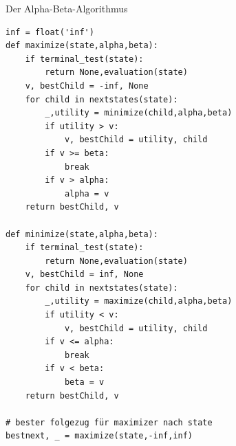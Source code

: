 %    
% 
% 
%    

\begin{frame}[fragile]
Der Alpha-Beta-Algorithmus \\
\begin{minipage}[t]{7.5cm}
\begin{lstlisting}[basicstyle=\tiny]
inf = float('inf')
def maximize(state,alpha,beta):
    if terminal_test(state):
        return None,evaluation(state)
    v, bestChild = -inf, None
    for child in nextstates(state):
        _,utility = minimize(child,alpha,beta)
        if utility > v:
            v, bestChild = utility, child
        if v >= beta:
            break
        if v > alpha:
            alpha = v
    return bestChild, v

def minimize(state,alpha,beta):
    if terminal_test(state):
        return None,evaluation(state)
    v, bestChild = inf, None
    for child in nextstates(state):
        _,utility = maximize(child,alpha,beta)
        if utility < v:
            v, bestChild = utility, child
        if v <= alpha:
            break
        if v < beta:
            beta = v
    return bestChild, v 

# bester folgezug für maximizer nach state
bestnext, _ = maximize(state,-inf,inf)
\end{lstlisting}  
\end{minipage} 
\end{frame}

